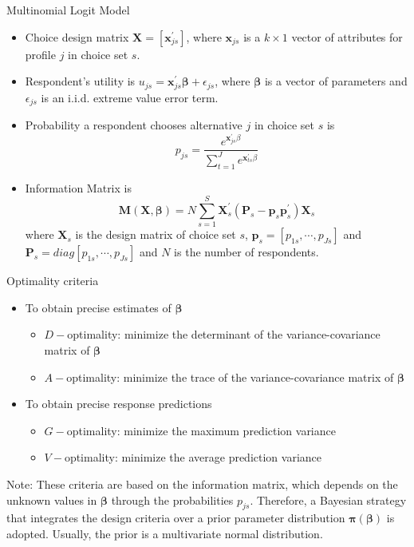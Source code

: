 \documentclass[11pt,t]{beamer}
\begin{document}
\begin{frame}[fragile]{Multinomial Logit Model}
	\begin{itemize}
		\item Choice design matrix $\mathbf{X} = [\mathbf{x}^{'}_{js}]$, where $\mathbf{x}_{js}$ is a $k \times 1$ vector of attributes for profile $j$ in choice set $s$.
		\item Respondent's utility is $u_{js} = \mathbf{x}^{'}_{js} \pmb{\beta}+ \epsilon_{js}$, where $\pmb{\beta}$ is a vector of parameters and $\epsilon_{js}$ is an i.i.d. extreme value error term.
		\item Probability a respondent chooses alternative $j$ in choice set $s$ is \\
			\vspace*{-4mm}
			$$p_{js}=\frac{e^{\mathbf{x}^{'}_{js} \beta}}{\sum^{J}_{t=1} e^{\mathbf{x}^{'}_{ts} \beta}}$$
		\item Information Matrix is \\ 
		\vspace*{-5mm}
			$$\mathbf{M}(\mathbf{X},\pmb{\beta}) = N \sum_{s=1}^{S} \mathbf{X}^{'}_s(\mathbf{P}_s-\mathbf{p}_s\mathbf{p}_s^{'})\mathbf{X}_s$$
			where $\mathbf{X}_s$ is the design matrix of choice set $s$, $\mathbf{p}_s = [p_{1s},\cdots,p_{Js}]$ and $\mathbf{P}_s = diag[p_{1s},\cdots,p_{Js}]$ and $N$ is the number of respondents.
	\end{itemize}
\end{frame}

\begin{frame}[fragile]{Optimality criteria}
	\begin{itemize}
		\item To obtain precise estimates of $\pmb{\beta}$
		\begin{itemize}
			\item \textcolor{kul-blue}{$\mathit{D}-$optimality: minimize the determinant of the variance-covariance matrix of $\pmb{\beta}$}
			\item $\mathit{A}-$optimality: minimize the trace of the variance-covariance matrix of $\pmb{\beta}$
		\end{itemize}
		\item To obtain precise response predictions
		\begin{itemize}
			\item $\mathit{G}-$optimality: minimize the maximum prediction variance
			\item $\mathit{V}-$optimality: minimize the average prediction variance
		\end{itemize}					
	\end{itemize}
	\begin{alertblock}{Note:}
		These criteria are based on the information matrix, which depends on the unknown values in $\pmb{\beta}$ through the probabilities $p_{js}$. Therefore, a Bayesian strategy that integrates the design criteria over a prior parameter distribution $\pmb{\pi(\beta)}$ is adopted. Usually, the prior is a multivariate normal distribution.
	\end{alertblock}
\end{frame}
\end{document}
